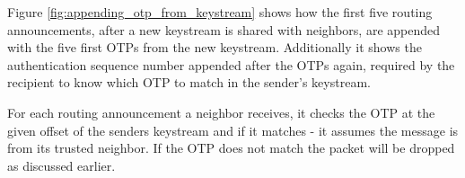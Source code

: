 Figure \ref{fig:appending_otp_from_keystream} shows how the first five routing
announcements, after a new keystream is shared with neighbors, are appended with
the five first \acp{OTP} from the new keystream. Additionally it shows the
authentication sequence number appended after the \acp{OTP} again, required by
the recipient to know which OTP to match in the sender's keystream.

For each routing announcement a neighbor receives, it checks the \ac{OTP} at the
given offset of the senders keystream and if it matches - it assumes the message
is from its trusted neighbor. If the \ac{OTP} does not match the packet will be
dropped as discussed earlier.


